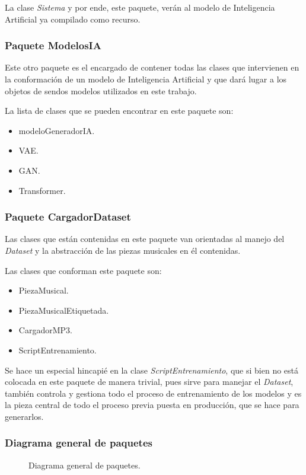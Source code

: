 La clase \emph{Sistema} y por ende, este paquete, verán al modelo de Inteligencia Artificial ya compilado como recurso.

\subsubsection{Paquete ModelosIA}

Este otro paquete es el encargado de contener todas las clases que intervienen en la conformación de un modelo de Inteligencia Artificial y que dará lugar a los objetos de sendos modelos utilizados en este trabajo.

La lista de clases que se pueden encontrar en este paquete son:
\begin{itemize}
  \item modeloGeneradorIA.
  \item VAE.
  \item GAN.
  \item Transformer.
\end{itemize}


\subsubsection{Paquete CargadorDataset}

Las clases que están contenidas en este paquete van orientadas al manejo del \emph{Dataset} y la abstracción de las piezas musicales en él contenidas.

Las clases que conforman este paquete son:
\begin{itemize}
  \item PiezaMusical.
  \item PiezaMusicalEtiquetada.
  \item CargadorMP3.
  \item ScriptEntrenamiento.
\end{itemize}

Se hace un especial hincapié en la clase \emph{ScriptEntrenamiento}, que si bien no está colocada en este paquete de manera trivial, pues sirve para manejar el \emph{Dataset}, también controla y gestiona todo el proceso de entrenamiento de los modelos y es la pieza central de todo el proceso previa puesta en producción, que se hace para generarlos.


\subsubsection{Diagrama general de paquetes}

\begin{figure}[H]
  \centering
  
  \caption{Diagrama general de paquetes.}
\end{figure}
